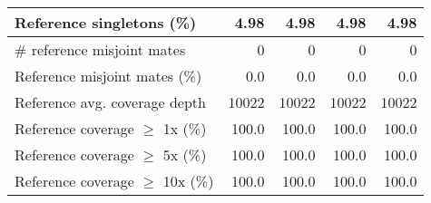 \documentclass[12pt,a4paper]{article}
\begin{document}
\begin{table}[ht]
\begin{center}
\begin{tabular}{|l*{4}{|r}|}
Reference singletons (\%) & 4.98 & 4.98 & 4.98 & 4.98 \\ \hline
\# reference misjoint mates & 0 & 0 & 0 & 0 \\ \hline
Reference misjoint mates (\%) & 0.0 & 0.0 & 0.0 & 0.0 \\ \hline
Reference avg. coverage depth & 10022 & 10022 & 10022 & 10022 \\ \hline
Reference coverage $\geq$ 1x (\%) & 100.0 & 100.0 & 100.0 & 100.0 \\ \hline
Reference coverage $\geq$ 5x (\%) & 100.0 & 100.0 & 100.0 & 100.0 \\ \hline
Reference coverage $\geq$ 10x (\%) & 100.0 & 100.0 & 100.0 & 100.0 \\ \hline
\end{tabular}
\end{center}
\end{table}
\end{document}
